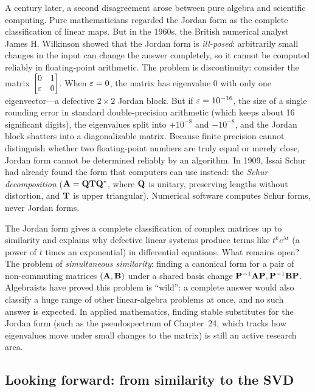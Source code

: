 \begin{historybox}
A century later, a second disagreement arose between pure algebra and scientific computing. Pure mathematicians regarded the Jordan form as the complete classification of linear maps. But in the 1960s, the British numerical analyst James H. Wilkinson showed that the Jordan form is \emph{ill-posed}: arbitrarily small changes in the input can change the answer completely, so it cannot be computed reliably in floating-point arithmetic. The problem is discontinuity: consider the matrix $\begin{bmatrix}0&1\\\varepsilon&0\end{bmatrix}$. When $\varepsilon = 0$, the matrix has eigenvalue $0$ with only one eigenvector---a defective $2\times 2$ Jordan block. But if $\varepsilon = 10^{-16}$, the size of a single rounding error in standard double-precision arithmetic (which keeps about 16 significant digits), the eigenvalues split into $+10^{-8}$ and $-10^{-8}$, and the Jordan block shatters into a diagonalizable matrix. Because finite precision cannot distinguish whether two floating-point numbers are truly equal or merely close, Jordan form cannot be determined reliably by an algorithm. In 1909, Issai Schur had already found the form that computers can use instead: the \emph{Schur decomposition} ($\mathbf{A} = \mathbf{Q}\mathbf{T}\mathbf{Q}^*$, where $\mathbf{Q}$ is unitary, preserving lengths without distortion, and $\mathbf{T}$ is upper triangular). Numerical software computes Schur forms, never Jordan forms.

The Jordan form gives a complete classification of complex matrices up to similarity and explains why defective linear systems produce terms like $t^k e^{\lambda t}$ (a power of $t$ times an exponential) in differential equations. What remains open? The problem of \emph{simultaneous similarity}: finding a canonical form for a pair of non-commuting matrices $(\mathbf{A}, \mathbf{B})$ under a shared basis change $\mathbf{P}^{-1}\mathbf{A}\mathbf{P}, \mathbf{P}^{-1}\mathbf{B}\mathbf{P}$. Algebraists have proved this problem is ``wild'': a complete answer would also classify a huge range of other linear-algebra problems at once, and no such answer is expected. In applied mathematics, finding stable substitutes for the Jordan form (such as the pseudospectrum of Chapter~24, which tracks how eigenvalues move under small changes to the matrix) is still an active research area.
\end{historybox}

\subsection*{Looking forward: from similarity to the SVD}

